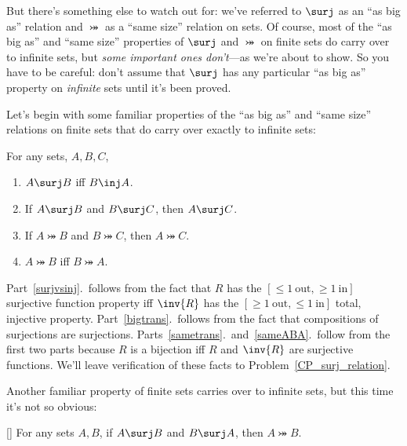 But there's something else to watch out for: we've referred to $\surj$
as an ``as big as'' relation and $\bij$ as a ``same size'' relation on
sets.  Of course, most of the ``as big as'' and ``same size''
properties of $\surj$ and $\bij$ on finite sets do carry over to
infinite sets, but \emph{some important ones don't}---as we're about
to show.  So you have to be careful: don't assume that $\surj$ has any
particular ``as big as'' property on \emph{infinite} sets until it's
been proved.

Let's begin with some familiar properties of the ``as big as'' and
``same size'' relations on finite sets that do carry over exactly to
infinite sets:
\begin{lemma}\label{surjinjbij_properties}
For any sets, $A,B,C$,
\begin{enumerate}

\item \label{surjvsinj} $A \surj B$ iff $B \inj A$.

\item \label{bigtrans} If $A \surj B$ and $B \surj C$, then $A \surj
  C$.

\item \label{sametrans} If $A \bij B$ and $B \bij C$, then $A \bij C$.

\item\label{sameABA} $A \bij B$ iff $B \bij A$.
\end{enumerate}
\end{lemma}

Part~\ref{surjvsinj}.\ follows from the fact that $R$ has the $[\le
  1\ \text{out}, \ge 1\ \text{in}]$ surjective function property iff
$\inv{R}$ has the $[\ge 1\ \text{out}, \le 1\ \text{in}]$ total,
injective property.  Part~\ref{bigtrans}.\ follows from the fact that
compositions of surjections are surjections.
Parts~\ref{sametrans}.\ and~\ref{sameABA}.\ follow from the first two
parts because $R$ is a bijection iff $R$ and $\inv{R}$ are surjective
functions.  We'll leave verification of these facts to
Problem~\ref{CP_surj_relation}.

Another familiar property of finite sets carries over to infinite
sets, but this time it's not so obvious:
\begin{theorem}\label{S-B_thm} \mbox{}
 [] For any sets $A,B$, if $A \surj B$ and
 $B \surj A$, then $A \bij B$.
\end{theorem}

